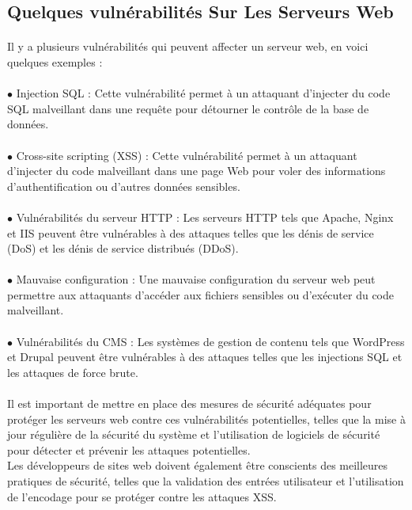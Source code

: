 \subsection{Quelques vulnérabilités Sur Les Serveurs Web }
\paragraph{ }
Il y a plusieurs vulnérabilités qui peuvent affecter un serveur web, en voici quelques exemples :
\paragraph{ }
$\bullet$ Injection SQL : Cette vulnérabilité permet à un attaquant d'injecter du code SQL malveillant dans une requête pour détourner le contrôle de la base de données.
\paragraph{ }
$\bullet$ Cross-site scripting (XSS) : Cette vulnérabilité permet à un attaquant d'injecter du code malveillant dans une page Web pour voler des informations d'authentification ou d'autres données sensibles.
\paragraph{ }
$\bullet$ Vulnérabilités du serveur HTTP : Les serveurs HTTP tels que Apache, Nginx et IIS peuvent être vulnérables à des attaques telles que les dénis de service (DoS) et les dénis de service distribués (DDoS).
\paragraph{ }
$\bullet$ Mauvaise configuration : Une mauvaise configuration du serveur web peut permettre aux attaquants d'accéder aux fichiers sensibles ou d'exécuter du code malveillant.
\paragraph{ }
$\bullet$ Vulnérabilités du CMS : Les systèmes de gestion de contenu tels que WordPress et Drupal peuvent être vulnérables à des attaques telles que les injections SQL et les attaques de force brute.\\
\paragraph{ }
Il est important de mettre en place des mesures de sécurité adéquates pour protéger les serveurs web contre ces vulnérabilités potentielles, telles que la mise à jour régulière de la sécurité du système et l'utilisation de logiciels de sécurité pour détecter et prévenir les attaques potentielles. \\Les développeurs de sites web doivent également être conscients des meilleures pratiques de sécurité, telles que la validation des entrées utilisateur et l'utilisation de l'encodage pour se protéger contre les attaques XSS.\\


